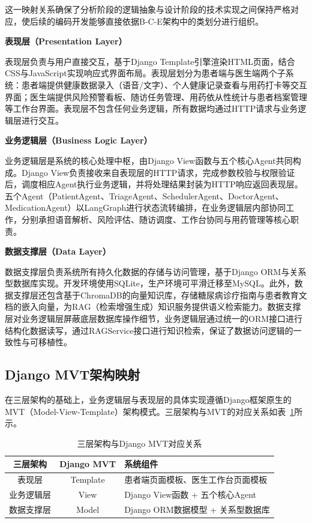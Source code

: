 这一映射关系确保了分析阶段的逻辑抽象与设计阶段的技术实现之间保持严格对应，使后续的编码开发能够直接依据B-C-E架构中的类划分进行组织。

\textbf{表现层（Presentation Layer）}

表现层负责与用户直接交互，基于Django Template引擎渲染HTML页面，结合CSS与JavaScript实现响应式界面布局。表现层划分为患者端与医生端两个子系统：患者端提供健康数据录入（语音/文字）、个人健康记录查看与用药打卡等交互界面；医生端提供风险预警看板、随访任务管理、用药依从性统计与患者档案管理等工作台界面。表现层不包含任何业务逻辑，所有数据均通过HTTP请求与业务逻辑层进行交互。

\textbf{业务逻辑层（Business Logic Layer）}

业务逻辑层是系统的核心处理中枢，由Django View函数与五个核心Agent共同构成。Django View负责接收来自表现层的HTTP请求，完成参数校验与权限验证后，调度相应Agent执行业务逻辑，并将处理结果封装为HTTP响应返回表现层。五个Agent（PatientAgent、TriageAgent、SchedulerAgent、DoctorAgent、MedicationAgent）以LangGraph进行状态流转编排，在业务逻辑层内部协同工作，分别承担语音解析、风险评估、随访调度、工作台协同与用药管理等核心职责。

\textbf{数据支撑层（Data Layer）}

数据支撑层负责系统所有持久化数据的存储与访问管理，基于Django ORM与关系型数据库实现。开发环境使用SQLite，生产环境可平滑迁移至MySQL。此外，数据支撑层还包含基于ChromaDB的向量知识库，存储糖尿病诊疗指南与患者教育文档的嵌入向量，为RAG（检索增强生成）知识服务提供语义检索能力。数据支撑层对业务逻辑层屏蔽底层数据库操作细节，业务逻辑层通过统一的ORM接口进行结构化数据读写，通过RAGService接口进行知识检索，保证了数据访问逻辑的一致性与可移植性。


\subsection{Django MVT架构映射}

在三层架构的基础上，业务逻辑层与表现层的具体实现遵循Django框架原生的MVT（Model-View-Template）架构模式。三层架构与MVT的对应关系如表~\ref{tab:mvt-mapping}所示。

\begin{table}[H]
\centering
\caption{三层架构与Django MVT对应关系}
\label{tab:mvt-mapping}
\begin{tabularx}{\textwidth}{|c|c|X|}
\hline
\textbf{三层架构} & \textbf{Django MVT} & \textbf{系统组件} \\
\hline
表现层 & Template & 患者端页面模板、医生工作台页面模板 \\
\hline
业务逻辑层 & View & Django View函数 + 五个核心Agent \\
\hline
数据支撑层 & Model & Django ORM数据模型 + 关系型数据库 \\
\hline
\end{tabularx}
\end{table}

